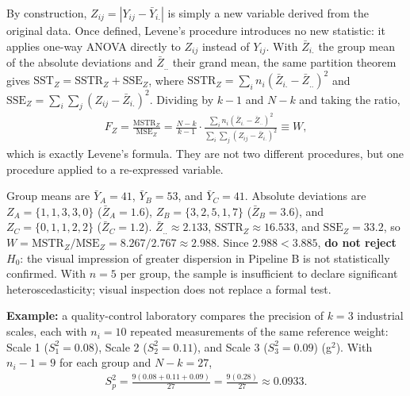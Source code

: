 \begin{solproblema}[prob:e2546e4]
By construction, $Z_{ij}=|Y_{ij}-\bar Y_{i.}|$ is simply a new variable derived from the original data. Once defined, Levene's procedure introduces no new statistic: it applies one-way ANOVA directly to $Z_{ij}$ instead of $Y_{ij}$. With $\bar Z_{i.}$ the group mean of the absolute deviations and $\bar Z_{..}$ their grand mean, the same partition theorem gives $\text{SST}_Z=\text{SSTR}_Z+\text{SSE}_Z$, where $\text{SSTR}_Z=\sum_i n_i(\bar Z_{i.}-\bar Z_{..})^2$ and $\text{SSE}_Z=\sum_i\sum_j(Z_{ij}-\bar Z_{i.})^2$. Dividing by $k-1$ and $N-k$ and taking the ratio,
\begin{align*}
F_Z=\frac{\text{MSTR}_Z}{\text{MSE}_Z}=\frac{N-k}{k-1}\cdot\frac{\sum_i n_i(\bar Z_{i.}-\bar Z_{..})^2}{\sum_i\sum_j(Z_{ij}-\bar Z_{i.})^2}\equiv W,
\end{align*}
which is exactly Levene's formula. They are not two different procedures, but one procedure applied to a re-expressed variable.
\end{solproblema}

\begin{solproblema}[prob:8dd2466]
Group means are $\bar Y_A=41$, $\bar Y_B=53$, and $\bar Y_C=41$. Absolute deviations are $Z_A=\{1,1,3,3,0\}$ ($\bar Z_A=1.6$), $Z_B=\{3,2,5,1,7\}$ ($\bar Z_B=3.6$), and $Z_C=\{0,1,1,2,2\}$ ($\bar Z_C=1.2$). $\bar Z_{..}\approx2.133$, $\text{SSTR}_Z\approx16.533$, and $\text{SSE}_Z=33.2$, so $W=\text{MSTR}_Z/\text{MSE}_Z=8.267/2.767\approx2.988$. Since $2.988<3.885$, \textbf{do not reject} $H_0$: the visual impression of greater dispersion in Pipeline B is not statistically confirmed. With $n=5$ per group, the sample is insufficient to declare significant heteroscedasticity; visual inspection does not replace a formal test.
\end{solproblema}

\begin{solproblema}[prob:095357b]
\textbf{Example:} a quality-control laboratory compares the precision of $k=3$ industrial scales, each with $n_i=10$ repeated measurements of the same reference weight: Scale 1 ($S_1^2=0.08$), Scale 2 ($S_2^2=0.11$), and Scale 3 ($S_3^2=0.09$) (g$^2$). With $n_i-1=9$ for each group and $N-k=27$,
\begin{align*}
S_p^2=\frac{9(0.08+0.11+0.09)}{27}=\frac{9(0.28)}{27}\approx0.0933.
\end{align*}
\end{solproblema}

